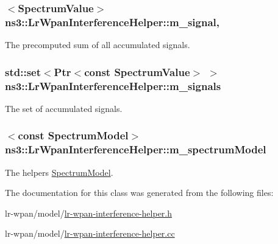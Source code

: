 \subsubsection[{\texorpdfstring{m\+\_\+signal}{m_signal}}]{$<${\bf Spectrum\+Value}$>$ ns3\+::\+Lr\+Wpan\+Interference\+Helper\+::m\+\_\+signal\hspace{0.3cm}{\ttfamily [mutable]}, {\ttfamily [private]}}\hypertarget{classns3_1_1LrWpanInterferenceHelper_acc5761573937b201a67cd2ca902e1f21}{}\label{classns3_1_1LrWpanInterferenceHelper_acc5761573937b201a67cd2ca902e1f21}
The precomputed sum of all accumulated signals. 
\subsubsection[{\texorpdfstring{m\+\_\+signals}{m_signals}}]{\setlength{\rightskip}{0pt plus 5cm}std\+::set$<${\bf Ptr}$<$const {\bf Spectrum\+Value}$>$ $>$ ns3\+::\+Lr\+Wpan\+Interference\+Helper\+::m\+\_\+signals\hspace{0.3cm}{\ttfamily [private]}}\hypertarget{classns3_1_1LrWpanInterferenceHelper_a441d09e63473eea61046bb0bb24e3bc7}{}\label{classns3_1_1LrWpanInterferenceHelper_a441d09e63473eea61046bb0bb24e3bc7}
The set of accumulated signals. 
\subsubsection[{\texorpdfstring{m\+\_\+spectrum\+Model}{m_spectrumModel}}]{$<$const {\bf Spectrum\+Model}$>$ ns3\+::\+Lr\+Wpan\+Interference\+Helper\+::m\+\_\+spectrum\+Model\hspace{0.3cm}{\ttfamily [private]}}\hypertarget{classns3_1_1LrWpanInterferenceHelper_a51e9ff732295b1df034bf296864aab38}{}\label{classns3_1_1LrWpanInterferenceHelper_a51e9ff732295b1df034bf296864aab38}
The helpers \hyperlink{classns3_1_1SpectrumModel}{Spectrum\+Model}. 

The documentation for this class was generated from the following files\+:\begin{DoxyCompactItemize}
\item 
lr-\/wpan/model/\hyperlink{lr-wpan-interference-helper_8h}{lr-\/wpan-\/interference-\/helper.\+h}\item 
lr-\/wpan/model/\hyperlink{lr-wpan-interference-helper_8cc}{lr-\/wpan-\/interference-\/helper.\+cc}\end{DoxyCompactItemize}
